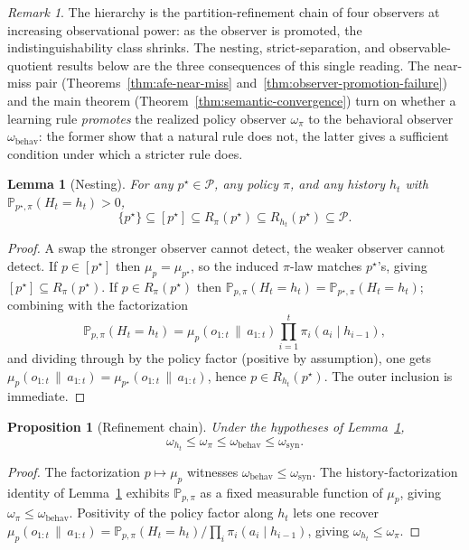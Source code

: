 \documentclass[11pt]{article}
\newtheorem{proposition}[theorem]{Proposition}
\newtheorem{lemma}[theorem]{Lemma}
\theoremstyle{definition}
\theoremstyle{remark}
\newtheorem{remark}[theorem]{Remark}
\newcommand{\Pcal}{\mathcal{P}}
\newcommand{\Prob}{\mathbb{P}}
\newcommand{\givena}{\,\|\,}
\begin{document}
\begin{remark}
\label{rem:four-observers}
The hierarchy is the partition-refinement chain of four observers at increasing observational power: as the observer is promoted, the indistinguishability class shrinks. The nesting, strict-separation, and observable-quotient results below are the three consequences of this single reading. The near-miss pair (Theorems~\ref{thm:afe-near-miss} and~\ref{thm:observer-promotion-failure}) and the main theorem (Theorem~\ref{thm:semantic-convergence}) turn on whether a learning rule \emph{promotes} the realized policy observer $\omega_\pi$ to the behavioral observer $\omega_{\mathrm{behav}}$: the former show that a natural rule does not, the latter gives a sufficient condition under which a stricter rule does.
\end{remark}

\begin{lemma}[Nesting]
\label{lem:nesting}
For any $p^\star\in\Pcal$, any policy $\pi$, and any history $h_t$ with $\Prob_{p^\star,\pi}(H_t=h_t)>0$,
\[
\{p^\star\}\subseteq [p^\star]\subseteq R_\pi(p^\star)\subseteq R_{h_t}(p^\star)\subseteq \Pcal.
\]
\end{lemma}

\begin{proof}
A swap the stronger observer cannot detect, the weaker observer cannot detect. If $p\in[p^\star]$ then $\mu_p=\mu_{p^\star}$, so the induced $\pi$-law matches $p^\star$'s, giving $[p^\star]\subseteq R_\pi(p^\star)$. If $p\in R_\pi(p^\star)$ then $\Prob_{p,\pi}(H_t=h_t)=\Prob_{p^\star,\pi}(H_t=h_t)$; combining with the factorization
\[
\Prob_{p,\pi}(H_t=h_t)=\mu_p(o_{1:t}\givena a_{1:t})\prod_{i=1}^t \pi_i(a_i\mid h_{i-1}),
\]
and dividing through by the policy factor (positive by assumption), one gets $\mu_p(o_{1:t}\givena a_{1:t})=\mu_{p^\star}(o_{1:t}\givena a_{1:t})$, hence $p\in R_{h_t}(p^\star)$. The outer inclusion is immediate.
\end{proof}

\begin{proposition}[Refinement chain]
\label{prop:refinement-chain}
Under the hypotheses of Lemma~\ref{lem:nesting},
\[
\omega_{h_t}\le\omega_\pi\le\omega_{\mathrm{behav}}\le\omega_{\mathrm{syn}}.
\]
\end{proposition}

\begin{proof}
The factorization $p\mapsto\mu_p$ witnesses $\omega_{\mathrm{behav}}\le\omega_{\mathrm{syn}}$. The history-factorization identity of Lemma~\ref{lem:nesting} exhibits $\Prob_{p,\pi}$ as a fixed measurable function of $\mu_p$, giving $\omega_\pi\le\omega_{\mathrm{behav}}$. Positivity of the policy factor along $h_t$ lets one recover $\mu_p(o_{1:t}\givena a_{1:t})=\Prob_{p,\pi}(H_t=h_t)/\prod_i\pi_i(a_i\mid h_{i-1})$, giving $\omega_{h_t}\le\omega_\pi$.
\end{proof}
\end{document}
